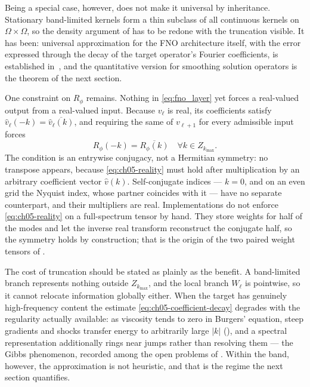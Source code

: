 Being a special case, however, does not make it universal by inheritance.
Stationary band-limited kernels form a thin subclass of all continuous kernels
on $\Omega \times \Omega$, so the density argument of
 has to be
redone with the truncation visible. It has been: universal approximation for
the FNO architecture itself, with the error expressed through the decay of the
target operator's Fourier coefficients, is established
in~\cite{kovachki2021universal}, and the quantitative version for smoothing
solution operators is the theorem of the next section.

One constraint on $R_\phi$ remains. Nothing in \eqref{eq:fno_layer} yet forces
a real-valued output from a real-valued input. Because $v_\ell$ is real, its
coefficients satisfy $\hat{v}_\ell(-k) = \overline{\hat{v}_\ell(k)}$, and
requiring the same of $v_{\ell+1}$ for every admissible input forces
\begin{equation}
  \label{eq:ch05-reality}
  R_\phi(-k) = \overline{R_\phi(k)} \quad \forall k \in Z_{k_{\max}}.
\end{equation}
The condition is an entrywise conjugacy, not a Hermitian symmetry: no transpose
appears, because \eqref{eq:ch05-reality} must hold after multiplication by an
arbitrary coefficient vector $\hat{v}(k)$. Self-conjugate indices --- $k = 0$,
and on an even grid the Nyquist index, whose partner coincides with it --- have
no separate counterpart, and their multipliers are real. Implementations do not
enforce \eqref{eq:ch05-reality} on a full-spectrum tensor by hand. They store
weights for half of the modes and let the inverse real transform reconstruct
the conjugate half, so the symmetry holds by construction; that is the origin of
the two paired weight tensors of
.

The cost of truncation should be stated as plainly as the benefit. A
band-limited branch represents nothing outside $Z_{k_{\max}}$, and the local
branch $W_\ell$ is pointwise, so it cannot relocate information globally either.
When the target has genuinely high-frequency content the estimate
\eqref{eq:ch05-coefficient-decay} degrades with the regularity actually
available: as viscosity tends to zero in Burgers' equation, steep gradients and
shocks transfer energy to arbitrarily large $|k|$
(), and a spectral
representation additionally rings near jumps rather than resolving them --- the
Gibbs phenomenon, recorded among the open problems of
. Within the band,
however, the approximation is not heuristic, and that is the regime the next
section quantifies.

